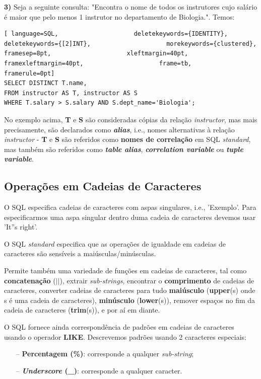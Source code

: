 \documentclass[oneside]{book}
\theoremstyle{definition}
\begin{document}
\textbf{3)} Seja a seguinte consulta: "Encontra o nome de todos os instrutores cujo salário é maior que pelo menos 1 instrutor no departamento de Biologia.". Temos:
\begin{lstlisting}[ language=SQL,                     deletekeywords={IDENTITY},                     deletekeywords={[2]INT},                     morekeywords={clustered},                     framesep=8pt,                     xleftmargin=40pt,                     framexleftmargin=40pt,                     frame=tb,                     framerule=0pt]
SELECT DISTINCT T.name,
FROM instructor AS T, instructor AS S
WHERE T.salary > S.salary AND S.dept_name='Biologia';
\end{lstlisting}

No exemplo acima, \textbf{T} e \textbf{S} são consideradas cópias da relação \textit{instructor}, mas mais precisamente, são declarados como \textbf{\textit{alias}}, i.e., nomes alternativas à relação \textit{instructor} - \textbf{T} e \textbf{S} são referidos como \textbf{nomes de correlação} em SQL \textit{standard}, mas também são referidos como \textbf{\textit{table alias}}, \textbf{\textit{correlation variable}} ou \textbf{\textit{tuple variable}}.

\subsection{Operações em Cadeias de Caracteres}

O SQL especifica cadeias de caracteres com aspas singulares, i.e., 'Exemplo'. Para especificarmos uma aspa singular dentro duma cadeia de caracteres devemos usar 'It''s right'.

O SQL \textit{standard} especifica que as operações de igualdade em cadeias de caracteres são sensíveis a maiúsculas/minúsculas.

Permite também uma variedade de funções em cadeias de caracteres, tal como \textbf{concatenação} ($||$), extrair \textit{sub-strings}, encontrar o \textbf{comprimento} de cadeias de caracteres, converter cadeias de caracteres para tudo \textbf{maiúsculo} (\textbf{upper}(s) onde s é uma cadeia de caracteres), \textbf{minúsculo} (\textbf{lower}(s)), remover espaços no fim da cadeia de caracteres (\textbf{trim}(s)), e por aí em diante.

O SQL fornece ainda correspondência de padrões em cadeias de caracteres usando o operador \textbf{LIKE}. Descrevemos padrões usando 2 caracteres especiais:
\begin{itemize}
    \itemsep0cm
    \item[--]\textbf{Percentagem (\%)}: corresponde a qualquer \textit{sub-string};
    \item[--]\textbf{\textit{Underscore} (\_)}: corresponde a qualquer caracter.
\end{itemize}
\end{document}
